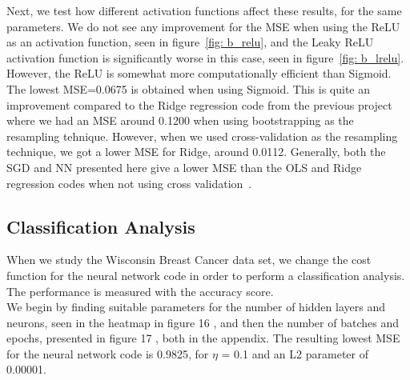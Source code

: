 \documentclass[english,notitlepage,reprint,nofootinbib]{revtex4-2}  %
\begin{document}
Next, we test how different activation functions affect these results, for the same parameters. 
We do not see any improvement for the MSE when using the ReLU as an activation function, seen in figure~\ref{fig: b_relu}, and the Leaky ReLU activation function is significantly worse in this case, seen in figure~\ref{fig: b_lrelu}. However, the ReLU is somewhat more computationally efficient than Sigmoid. 
The lowest MSE=0.0675 is obtained when using Sigmoid. This is quite an improvement compared to the Ridge regression code from the previous project where we had an MSE around 0.1200 when using bootstrapping as the resampling tehnique. However, when we used cross-validation as the resampling technique, we got a lower MSE for Ridge, around 0.0112. 
Generally, both the SGD and NN presented here give a lower MSE than the OLS and Ridge regression codes when not using cross validation~\cite{proj1}. 





\subsection*{Classification Analysis}%
When we study the Wisconsin Breast Cancer data set, we change the cost function for the neural network code in order to perform a classification analysis. The performance is measured with the accuracy score. 
\vspace{3mm}
\\ 
We begin by finding suitable parameters for the number of hidden layers and neurons, seen in the heatmap in figure 16
, and then the number of batches and epochs, presented in figure 17
, both in the appendix. 
The resulting lowest MSE for the neural network code is 0.9825, for $\eta$ = 0.1 and an L2 parameter of 0.00001. 
\end{document}
